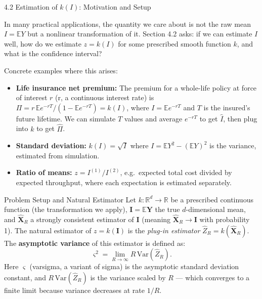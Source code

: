 \documentclass[aspectratio=169,10pt]{beamer}
\begin{document}
\begin{frame}[allowframebreaks]{4.2 Estimation of $k(I)$: Motivation and Setup}

In many practical applications, the quantity we care about is not the
raw mean $I = \mathbb{E}Y$ but a nonlinear transformation of it.
Section 4.2 asks: if we can estimate $I$ well, how do we estimate
$z = k(I)$ for some prescribed smooth function $k$, and what is the
confidence interval?

Concrete examples where this arises:

\begin{itemize}
  \item \textbf{Life insurance net premium:}  The premium for a whole-life
    policy at force of interest $r$ (r, a continuous interest rate) is
    $\Pi = r\,\mathbb{E}e^{-rT}/(1-\mathbb{E}e^{-rT}) = k(I)$, where
    $I = \mathbb{E}e^{-rT}$ and $T$ is the insured's future lifetime.
    We can simulate $T$ values and average $e^{-rT}$ to get $\hat{I}$,
    then plug into $k$ to get $\hat{\Pi}$.

  \item \textbf{Standard deviation:}  $k(I) = \sqrt{I}$ where
    $I = \mathbb{E}Y^2 - (\mathbb{E}Y)^2$ is the variance, estimated
    from simulation.

  \item \textbf{Ratio of means:}  $z = I^{(1)}/I^{(2)}$, e.g.\ expected
    total cost divided by expected throughput, where each expectation is
    estimated separately.
\end{itemize}

\begin{block}{Problem Setup and Natural Estimator}
  Let $k : \mathbb{R}^d \to \mathbb{R}$ be a prescribed continuous
  function (the transformation we apply), $\mathbf{I} = \mathbb{E}\mathbf{Y}$
  the true $d$-dimensional mean, and $\hat{\mathbf{X}}_R$ a strongly
  consistent estimator of $\mathbf{I}$ (meaning
  $\hat{\mathbf{X}}_R \to \mathbf{I}$ with probability 1).  The natural
  estimator of $z = k(\mathbf{I})$ is the \emph{plug-in estimator}
  $\hat{Z}_R = k(\hat{\mathbf{X}}_R)$.  The \textbf{asymptotic variance}
  of this estimator is defined as:
  \[
    \varsigma^2 = \lim_{R\to\infty} R\,\mathrm{Var}(\hat{Z}_R).
  \]
  Here $\varsigma$ (varsigma, a variant of sigma) is the asymptotic
  standard deviation constant, and $R\,\mathrm{Var}(\hat{Z}_R)$ is the
  variance scaled by $R$ --- which converges to a finite limit because
  variance decreases at rate $1/R$.
\end{block}


\end{frame}
\end{document}
